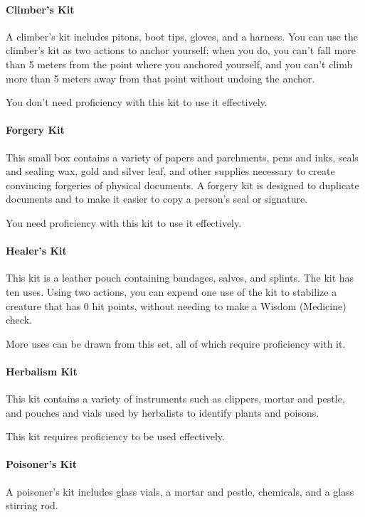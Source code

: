 \paragraph{Climber's Kit}
        A climber's kit includes pitons, boot tips, gloves, and a harness.
        You can use the climber's kit as two actions to anchor yourself; when you do, you can't fall more than 5 meters from the point where you anchored yourself, and you can't climb more than 5 meters away from that point without undoing the anchor.

        You don't need proficiency with this kit to use it effectively.
\paragraph{Forgery Kit}
        This small box contains a variety of papers and parchments, pens and inks, seals and sealing wax, gold and silver leaf, and other supplies necessary to create convincing forgeries of physical documents.
        A forgery kit is designed to duplicate documents and to make it easier to copy a person's seal or signature.

        You need proficiency with this kit to use it effectively.
\paragraph{Healer's Kit}
        This kit is a leather pouch containing bandages, salves, and splints.
        The kit has ten uses.
        Using two actions, you can expend one use of the kit to stabilize a creature that has 0 hit points, without needing to make a Wisdom (Medicine) check.

        More uses can be drawn from this set, all of which require proficiency with it.
\paragraph{Herbalism Kit}
        This kit contains a variety of instruments such as clippers, mortar and pestle, and pouches and vials used by herbalists to identify plants and poisons.

        This kit requires proficiency to be used effectively.
\paragraph{Poisoner's Kit}
        A poisoner's kit includes glass vials, a mortar and pestle, chemicals, and a glass stirring rod.
\newpage~\newpage~\newpage
